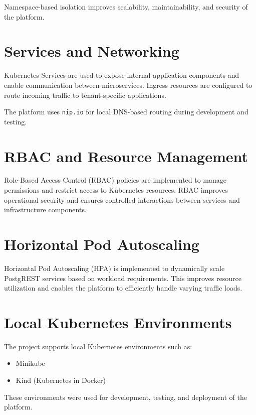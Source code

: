 \documentclass[12pt,a4paper]{report}
\begin{document}
Namespace-based isolation improves scalability, maintainability, and security of the platform.

\section{Services and Networking}

Kubernetes Services are used to expose internal application components and enable communication between microservices. Ingress resources are configured to route incoming traffic to tenant-specific applications.

The platform uses \texttt{nip.io} for local DNS-based routing during development and testing.

\section{RBAC and Resource Management}

Role-Based Access Control (RBAC) policies are implemented to manage permissions and restrict access to Kubernetes resources. RBAC improves operational security and ensures controlled interactions between services and infrastructure components.

\section{Horizontal Pod Autoscaling}

Horizontal Pod Autoscaling (HPA) is implemented to dynamically scale PostgREST services based on workload requirements. This improves resource utilization and enables the platform to efficiently handle varying traffic loads.

\section{Local Kubernetes Environments}

The project supports local Kubernetes environments such as:

\begin{itemize}

    \item Minikube
    \item Kind (Kubernetes in Docker)

\end{itemize}

These environments were used for development, testing, and deployment of the platform.
\end{document}
